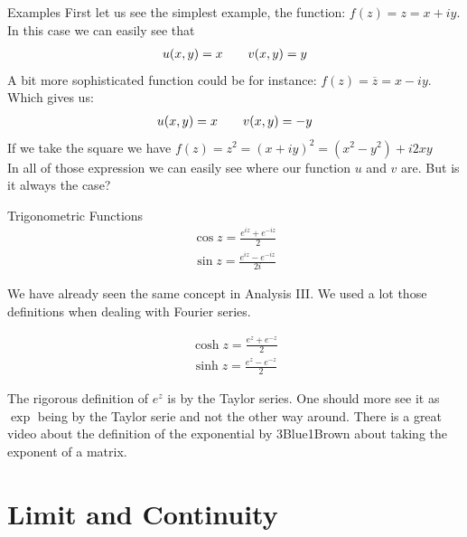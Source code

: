 \begin{parag}{Examples}
    First let us see the simplest example, the  function: $f\left(z\right)=  z =  x + iy$. In this case we can easily see that 
	\begin{align*} u(x, y) = x \mathspace \mathspace v\left(x, y\right) =  y \end{align*}
	A bit more sophisticated function could be for instance: $f\left(z\right) =  \overline{z} = x - iy$. Which gives us:
	\begin{align*} 
		u\left(x, y\right) =  x \mathspace \mathspace v\left(x, y\right) =  -y
	\end{align*}
	If we take the square we have $f\left(z\right) =  z^2 =  \left(x + iy\right)^2 = \left(x^2 - y^2\right) + i2xy$\\

	In all of those expression we can easily see where our function $u$ and $v$ are. But is it always the case?
\end{parag}


\begin{parag}{Trigonometric Functions}
    \begin{align*} \cos z = \frac{e^{iz} + e^{-iz}}{2} \end{align*}
	\begin{align*} \sin z = \frac{e^{iz} - e^{-iz}}{2i} \end{align*}
	\begin{framedremark}
	We have already seen the same concept in Analysis III. We used a lot those definitions when dealing with Fourier series.
	\end{framedremark}
	\begin{align*} 
		\cosh z =  \frac{e^{z} + e^{-z}}{2}
	\end{align*}
	\begin{align*} 
		\sinh z = \frac{e^{z} - e^{-z}}{2}
	\end{align*}
\begin{framedremark}
	The rigorous definition of $e^{z}$ is by the Taylor series. One should more see it as $\exp$ being  by the Taylor serie and not the other way around. There is a great video about the definition of the exponential by 3Blue1Brown about taking the exponent of a matrix.
\end{framedremark}
\end{parag}

\section{Limit and Continuity}

